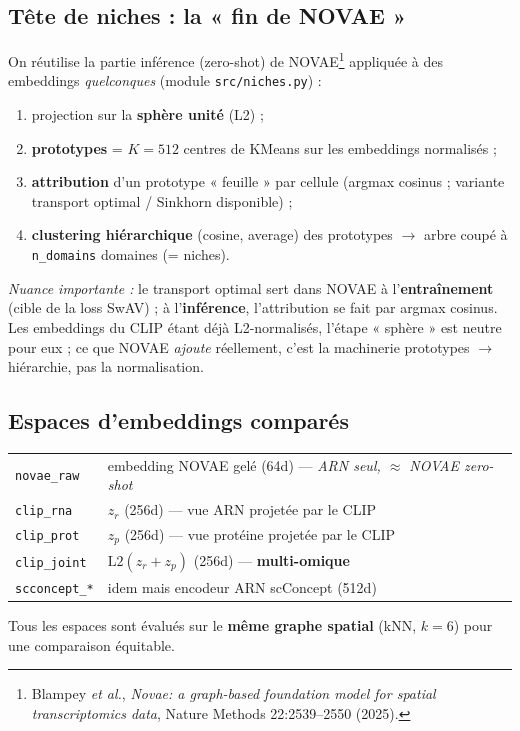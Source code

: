 \documentclass[11pt,a4paper]{article}
\begin{document}
\subsection{Tête de niches : la « fin de NOVAE »}
On réutilise la partie inférence (zero-shot) de NOVAE\footnote{Blampey \emph{et al.},
\emph{Novae: a graph-based foundation model for spatial transcriptomics data},
Nature Methods 22:2539--2550 (2025).} appliquée à des embeddings \emph{quelconques}
(module \texttt{src/niches.py}) :
\begin{enumerate}[noitemsep]
  \item projection sur la \textbf{sphère unité} (L2) ;
  \item \textbf{prototypes} = $K{=}512$ centres de KMeans sur les embeddings normalisés ;
  \item \textbf{attribution} d'un prototype « feuille » par cellule (argmax cosinus ;
        variante transport optimal / Sinkhorn disponible) ;
  \item \textbf{clustering hiérarchique} (cosine, average) des prototypes $\rightarrow$ arbre
        coupé à \texttt{n\_domains} domaines (= niches).
\end{enumerate}
\emph{Nuance importante :} le transport optimal sert dans NOVAE à l'\textbf{entraînement}
(cible de la loss SwAV) ; à l'\textbf{inférence}, l'attribution se fait par argmax cosinus.
Les embeddings du CLIP étant déjà L2-normalisés, l'étape « sphère » est neutre pour eux ;
ce que NOVAE \emph{ajoute} réellement, c'est la machinerie prototypes $\rightarrow$
hiérarchie, pas la normalisation.

\subsection{Espaces d'embeddings comparés}
\begin{center}
\small
\begin{tabular}{ll}
\toprule
\texttt{novae\_raw} & embedding NOVAE gelé (64d) --- \emph{ARN seul, $\approx$ NOVAE zero-shot} \\
\texttt{clip\_rna}  & $z_r$ (256d) --- vue ARN projetée par le CLIP \\
\texttt{clip\_prot} & $z_p$ (256d) --- vue protéine projetée par le CLIP \\
\texttt{clip\_joint}& $\mathrm{L2}(z_r{+}z_p)$ (256d) --- \textbf{multi-omique} \\
\texttt{scconcept\_*}& idem mais encodeur ARN scConcept (512d) \\
\bottomrule
\end{tabular}
\end{center}
Tous les espaces sont évalués sur le \textbf{même graphe spatial} (kNN, $k{=}6$) pour une
comparaison équitable.
\end{document}
